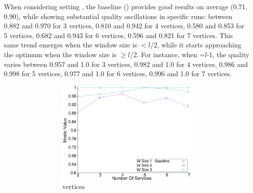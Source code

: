     When considering setting \wide, the baseline () provides good results on average (0.71, 0.90), while showing substantial quality oscillations in specific runs: between 0.882 and 0.970 for 3 vertices, 0.810 and 0.942 for 4 vertices, 0.580 and 0.853 for 5 vertices, 0.682 and 0.943 for 6 vertices, 0.596 and 0.821 for 7 vertices. This same trend emerges when the window size is $<$$l$/2, while it starts approaching the optimum when the window size is $\geq$$l$/2. For instance, when \windowsize=$l$-1, the quality varies between 0.957 and 1.0 for 3 vertices, 0.982 and 1.0 for 4 vertices, 0.986 and 0.998 for 5 vertices, 0.977 and 1.0 for 6 vertices, 0.996 and 1.0 for 7 vertices.

    \begin{figure}[H]
      \centering
      \begin{adjustbox}{minipage=\linewidth,scale=0.75}
        \begin{subfigure}{0.45\textwidth}
          \begin{subfigure}{\textwidth}
            \includegraphics[width=\textwidth]{Images/graphs/window_quality_performance_diff_perce_n7_s7_20_100_n3}
            \caption{ vertices}
            \label{fig:quality_window_wide_perce_n3}
          \end{subfigure}
          \begin{subfigure}{\textwidth}

\end{subfigure}
\end{subfigure}
\end{adjustbox}
\end{figure}
